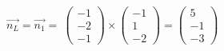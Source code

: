 \documentclass[preview]{standalone}
\begin{document}
\begin{center}
$\vec{n_L} = \vec{n_1} = \:\begin{pmatrix} -1 \\ -2 \\ -1 \end{pmatrix} \times \begin{pmatrix} -1 \\ 1 \\ -2 \end{pmatrix} = \begin{pmatrix} 5 \\ -1 \\ -3 \end{pmatrix}$
\end{center}
\end{document}
